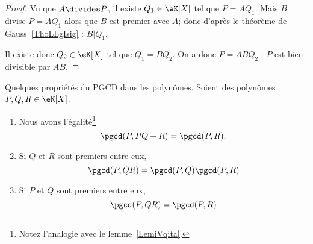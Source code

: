 \begin{proof}
    Vu que \( A\divides P\), il existe \( Q_1\in \eK[X]\) tel que \( P=AQ_1\). Mais \( B\) divise \( P=AQ_1\) alors que \( B\) est premier avec \( A\); donc d'après le théorème de Gauss~\ref{ThoLLgIsig} : $B|Q_1$.

    Il existe donc $Q_2\in \eK[X]$ tel que $Q_1=BQ_2$. On a donc $P=ABQ_2$ : $P$ est bien divisible par $AB$.
\end{proof}

\begin{lemma}   \label{LemUELTuwK}
    Quelques propriétés du PGCD dans les polynômes. Soient des polynômes \( P,Q,R\in \eK[X]\).
    \begin{enumerate}
        \item       \label{ITEMooBPOZooYeFGjl}
            Nous avons l'égalité\footnote{Notez l'analogie avec le lemme~\ref{LemiVqita}.}
            \begin{equation}
                \pgcd(P,PQ+R)=\pgcd(P,R).
            \end{equation}
        \item       \label{ITEMooUVGRooNSGDZn}
            Si \( Q \) et \( R\) sont premiers entre eux,
            \begin{equation}
                \pgcd(P,QR)=\pgcd(P,Q)\pgcd(P,R)
            \end{equation}
        \item       \label{ITEMooYXAHooXibkgV}
            Si \( P\) et \( Q\) sont premiers entre eux,
            \begin{equation}
                \pgcd(P,QR)=\pgcd(P,R)
            \end{equation}
    \end{enumerate}
\end{lemma}

